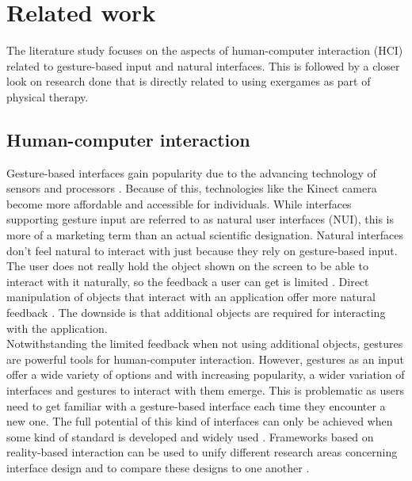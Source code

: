 \chapter{Related work}
\label{chapter: related work}

The literature study focuses on the aspects of human-computer interaction (HCI) related to gesture-based input and natural interfaces. This is followed by a closer look on research done that is directly related to using exergames as part of physical therapy.

\section{Human-computer interaction}


Gesture-based interfaces gain popularity due to the advancing technology of sensors and processors \cite{Jacob2008}. Because of this, technologies like the Kinect camera become more affordable and accessible for individuals. While interfaces supporting gesture input are referred to as natural user interfaces (NUI), this is more of a marketing term than an actual scientific designation. Natural interfaces don't feel natural to interact with just because they rely on gesture-based input. The user does not really hold the object shown on the screen to be able to interact with it naturally, so the feedback a user can get is limited \cite{Norman2010}. Direct manipulation of objects that interact with an application offer more natural feedback \cite{Shneiderman2010}. The downside is that additional objects are required for interacting with the application.\\

Notwithstanding the limited feedback when not using additional objects, gestures are powerful tools for human-computer interaction. However, gestures as an input offer a wide variety of options and with increasing popularity, a wider variation of interfaces and gestures to interact with them emerge. This is problematic as users need to get familiar with a gesture-based interface each time they encounter a new one. The full potential of this kind of interfaces can only be achieved when some kind of standard is developed and widely used \cite{Norman2010}. Frameworks based on reality-based interaction can be used to unify different research areas concerning interface design and to compare these designs to one another \cite{Jacob2008}.\\

